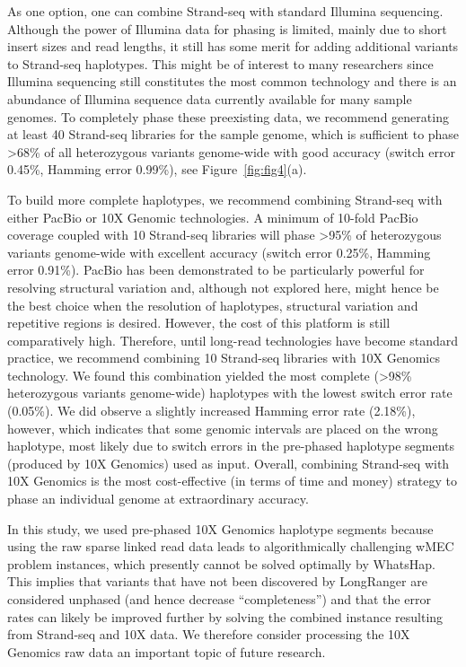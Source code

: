 	As one option, one can combine Strand-seq with standard Illumina sequencing. Although the power of Illumina data for phasing is limited, mainly due to short insert sizes and read lengths, it still has some merit for adding additional variants to Strand-seq haplotypes. 
	This might be of interest to many researchers since Illumina sequencing still constitutes the most common technology and there is an abundance of Illumina sequence data currently available for many sample genomes. 
	To completely phase these preexisting data, we recommend generating at least 40 Strand-seq libraries for the sample genome, which is sufficient to phase >68\% of all heterozygous variants genome-wide with good accuracy 
	(switch error 0.45\%, Hamming error 0.99\%), see Figure~\ref{fig:fig4}(a).
	
	To build more complete haplotypes, we recommend combining Strand-seq with either PacBio or 10X Genomic technologies. A minimum of 10-fold PacBio coverage coupled with 10 Strand-seq 
	libraries will phase >95\% of heterozygous variants genome-wide with excellent accuracy (switch error 0.25\%, Hamming error 0.91\%). 
	PacBio has been demonstrated to be particularly powerful for resolving structural variation \citep{huddleston2017discovery, chaisson2015genetic} and, 
	although not explored here, might hence be the best choice when the resolution of haplotypes, structural variation and repetitive regions is desired. 
	However, the cost of this platform is still comparatively high. Therefore, until long-read technologies have become standard practice, we recommend combining 10 Strand-seq 
	libraries with 10X Genomics technology. We found this combination yielded the most complete (>98\% heterozygous variants genome-wide) haplotypes with the lowest switch error rate (0.05\%). 
	We did observe a slightly increased Hamming error rate (2.18\%), however, which indicates that some genomic intervals are placed on the wrong haplotype, most likely due to switch errors 
	in the pre-phased haplotype segments (produced by 10X Genomics) used as input. Overall, combining Strand-seq with 10X Genomics is the most cost-effective (in terms of time and money) strategy to phase an individual genome at extraordinary accuracy.

	
	In this study, we used pre-phased 10X Genomics haplotype segments because using the raw sparse linked read data leads to algorithmically challenging wMEC problem instances, 
	which presently cannot be solved optimally by WhatsHap. This implies that variants that have not been discovered by LongRanger are considered unphased (and hence decrease “completeness”) 
	and that the error rates can likely be improved further by solving the combined instance resulting from Strand-seq and 10X data. We therefore consider processing the 10X Genomics raw data an important topic of future research.

